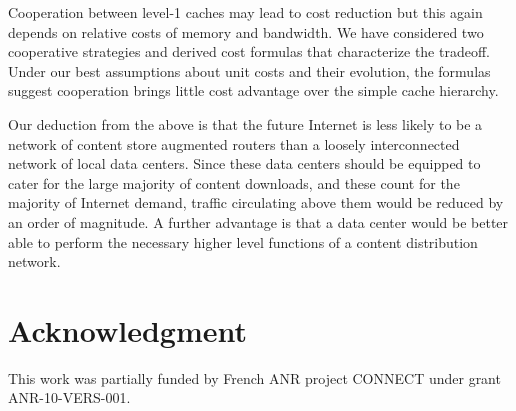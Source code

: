 \documentclass [11pt]{article}
\begin{document}
Cooperation between level-1 caches may lead to cost reduction but this again depends on relative costs of memory and bandwidth. We have considered two cooperative strategies and derived cost formulas that characterize the tradeoff. Under our best assumptions about unit costs and their evolution, the formulas suggest cooperation brings little cost advantage over the simple cache hierarchy.

Our deduction from the above is that the future Internet is less likely to be a network of content store augmented routers than a loosely interconnected network of local data centers. Since these data centers should be equipped to cater for the large majority of content downloads, and these count for the majority of Internet demand, traffic circulating above them would be reduced by an order of magnitude. A further advantage is that a data center would be better able to perform the necessary higher level functions of a content distribution network.  

\section*{Acknowledgment}
This work was partially funded by French ANR project CONNECT under grant ANR-10-VERS-001.



\end{document}
